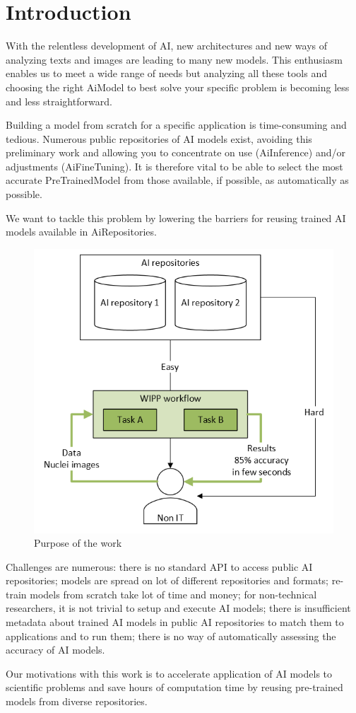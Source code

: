 \section{Introduction}
\label{sec:intro}

With the relentless development of \Gls{AI}, new
architectures and new ways of analyzing texts and images are leading to many new
models. This enthusiasm enables us to meet a wide range of needs but analyzing
all these tools and choosing the right \Gls{AiModel} to best solve your specific
problem is becoming less and less straightforward.

Building a model from scratch for a specific application is time-consuming and
tedious. Numerous public repositories of AI models exist, avoiding this
preliminary work and allowing you to concentrate on use (\Gls{AiInference}) and/or
adjustments (\Gls{AiFineTuning}). It is therefore vital to be able to select the most
accurate \Gls{PreTrainedModel} from those available, if possible, as automatically
as possible.

We want to tackle this problem by lowering the barriers for reusing trained AI
models available in \Gls{AiRepositories}.

\begin{figure}[H]
\centering
\includegraphics[width=0.8\linewidth]{png/introduction/layman.png}
\caption{Purpose of the work}
\end{figure}

Challenges are numerous: there is no
standard \Gls{API} to access public AI repositories; models are spread on
lot of different repositories and formats; re-train models from scratch take lot
of time and money; for non-technical researchers, it is not trivial to setup and
execute AI models; there is insufficient metadata about trained AI models in
public AI repositories to match them to applications and to run them; there
is no way of automatically assessing the accuracy of AI models.

Our motivations with this work is to accelerate application of AI models to
scientific problems and save hours of computation time by reusing pre-trained
models from diverse repositories.




